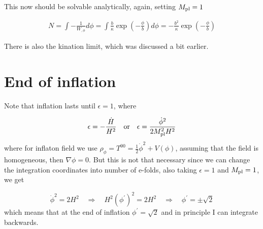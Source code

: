This now should be solvable analytically, again, setting $M_{\rm pl} = 1$

\begin{align*}
    N = \int -\frac{1}{W_{, \phi}} d\phi = \int \frac{b}{\kappa} \exp \left( - \frac{\phi}{b} \right) d \phi = -\frac{b^2}{\kappa} \exp(-\frac{\phi}{b})
\end{align*}

There is also the kination limit, which was discussed a bit earlier.

\section{End of inflation}

Note that inflation lasts until $\epsilon = 1$, where 

\begin{equation*}
    \epsilon = - \frac{\dot{H}}{H^2} \quad \text{or} \quad \epsilon = \frac{\dot{\phi}^2}{2 M_{\rm pl}^2H^2}
\end{equation*}
where for inflaton field we use $\rho_{\phi} = T^{00} = \frac{1}{2} \dot{\phi}^2 + V(\phi)$, assuming that the field is homogeneous, then $\nabla \phi = 0$. But this is not that necessary since we can change the integration coordinates into number of e-folds, also taking $\epsilon = 1$ and $M_{\rm pl} = 1$, we get

\begin{equation*}
    \dot{\phi}^2 = 2 H^2 \quad \Rightarrow \quad H^2 (\phi^{\prime})^2 = 2 H^2 \quad 
    \Rightarrow \quad \phi^{\prime} = \pm \sqrt{2} 
\end{equation*}
which means that at the end of inflation $\phi^{\prime} = \sqrt{2}$ and in principle I can integrate backwards.